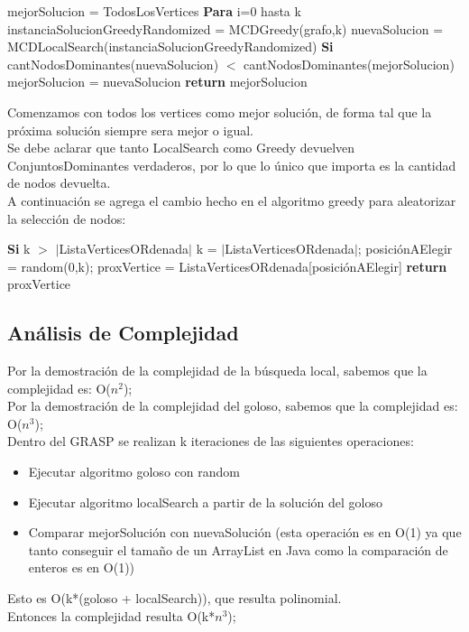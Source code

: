 \begin{codebox}
\li	mejorSolucion = TodosLosVertices
\li \textbf{Para} i=0 hasta k \Do
\li 	instanciaSolucionGreedyRandomized = MCDGreedy(grafo,k)
\li	nuevaSolucion = MCDLocalSearch(instanciaSolucionGreedyRandomized)
\li 	\textbf{Si} cantNodosDominantes(nuevaSolucion) $<$ cantNodosDominantes(mejorSolucion)  \Do
\li		mejorSolucion = nuevaSolucion
	\End
    \End	
\li	\textbf{return} mejorSolucion	
\end{codebox}
Comenzamos con todos los vertices como mejor solución, de forma tal que la próxima solución siempre sera mejor o igual.\\
Se debe aclarar que tanto LocalSearch como Greedy devuelven ConjuntosDominantes verdaderos, por lo que lo único que importa es la cantidad de nodos devuelta.\\

A continuación se agrega el cambio hecho en el algoritmo greedy para aleatorizar la selección de nodos:\\
\begin{codebox}
\li     \textbf{Si} k $>$ $|$ListaVerticesORdenada$|$ \Do
\li 		k = $|$ListaVerticesORdenada$|$;
\End
\li 	posiciónAElegir = random(0,k);
\li	proxVertice = ListaVerticesORdenada[posiciónAElegir]
\li 	\textbf{return} proxVertice
\end{codebox}

\subsection{Análisis de Complejidad}
Por la demostración de la complejidad de la búsqueda local, sabemos que la complejidad es: O($n^2$);\\
Por la demostración de la complejidad del goloso, sabemos que la complejidad es: O($n^3$);\\
Dentro del GRASP se realizan k iteraciones de las siguientes operaciones:
\begin{itemize}
\item Ejecutar algoritmo goloso con random
\item Ejecutar algoritmo localSearch a partir de la solución del goloso
\item Comparar mejorSolución con nuevaSolución (esta operación es en O(1) ya que tanto conseguir el tamaño de un ArrayList en Java como la comparación de enteros es en O(1)) 
\end{itemize}
Esto es O(k*(goloso + localSearch)), que resulta polinomial.\\
Entonces la complejidad resulta O(k*$n^3$);

